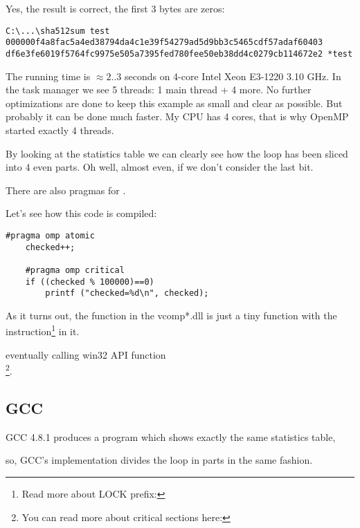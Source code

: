 Yes, the result is correct, the first 3 bytes are zeros:

\begin{lstlisting}
C:\...\sha512sum test
000000f4a8fac5a4ed38794da4c1e39f54279ad5d9bb3c5465cdf57adaf60403
df6e3fe6019f5764fc9975e505a7395fed780fee50eb38dd4c0279cb114672e2 *test
\end{lstlisting}

The running time is $\approx2..3$ seconds on 4-core Intel Xeon E3-1220 3.10 GHz.
In the task manager we see 5 threads: 
1 main thread + 4 more.
No further optimizations are done to keep this example as small and clear as possible.
But probably it can be done much faster.
My \ac{CPU} has 4 cores, that is why OpenMP 
started exactly 4 threads.

By looking at the statistics table we can clearly see how the loop has been sliced into 4 even parts.
Oh well, almost even, if we don't consider the last bit.

There are also pragmas for 
.

Let's see how this code is compiled:

\begin{lstlisting}[style=customc]
	#pragma omp atomic
	checked++;

	#pragma omp critical
	if ((checked % 100000)==0)
		printf ("checked=%d\n", checked);
\end{lstlisting}



As it turns out, the  
function in the vcomp*.dll 
is just a tiny function
with the  instruction\footnote{
Read more about LOCK prefix: } in it.

eventually calling win32 \ac{API} function \\
\footnote{You can read more about critical sections 
here: }.

\subsection{GCC}

GCC 4.8.1 
produces a program which shows exactly the same statistics table, 

so, GCC's implementation divides the loop in parts in the same fashion.

